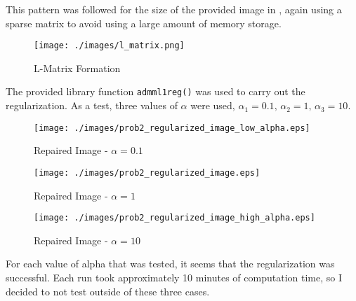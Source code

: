 This pattern was followed for the size of the provided image in \MATLAB, again using a sparse matrix to avoid using a large amount of memory storage. 

\begin{figure}[h] 
	\centering
	\texttt{[image: ./images/l\_matrix.png]}
	\caption{\MATLAB L-Matrix Formation}
	\label{fig: prob2 l matrix}
\end{figure}
\FloatBarrier

The provided library function \verb|admml1reg()| was used to carry out the regularization. As a test, three values of $\alpha$ were used, $\alpha_1 = 0.1,\,\alpha_2 = 1,\,\alpha_3 = 10$.

\begin{figure}[h] 
	\centering
	\texttt{[image: ./images/prob2\_regularized\_image\_low\_alpha.eps]}
	\caption{Repaired Image - $\alpha = 0.1$}
	\label{fig: low alpha}
\end{figure}
\FloatBarrier

\begin{figure}[h] 
	\centering
	\texttt{[image: ./images/prob2\_regularized\_image.eps]}
	\caption{Repaired Image - $\alpha = 1$}
	\label{fig: alpha is one}
\end{figure}
\FloatBarrier

\begin{figure}[h] 
	\centering
	\texttt{[image: ./images/prob2\_regularized\_image\_high\_alpha.eps]}
	\caption{Repaired Image - $\alpha = 10$}
	\label{fig: high alpha}
\end{figure}
\FloatBarrier

For each value of alpha that was tested, it seems that the regularization was successful. Each run took approximately 10 minutes of computation time, so I decided to not test outside of these three cases.

